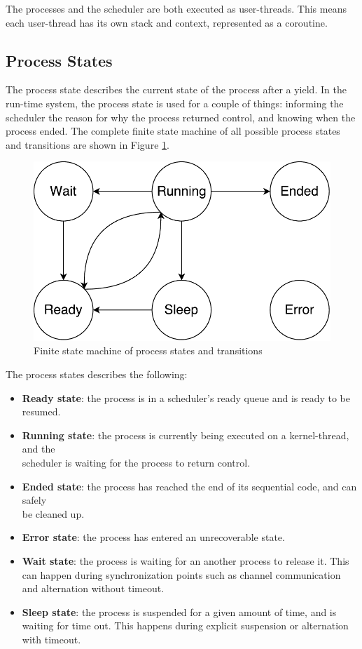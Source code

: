 The processes and the scheduler are both executed as user\hyp{}threads. This means each user\hyp{}thread has its own stack and context, represented as a coroutine.


\subsection{Process States}

The process state describes the current state of the process after a yield. In the run\hyp{}time system, the process state is used for a couple of things: informing the scheduler the reason for why the process returned control, and knowing when the process ended. The complete finite state machine of all possible process states and transitions are shown in Figure \ref{fig:process_state_fsm}. 
 
\FloatBarrier

\begin{figure}[h]
    \centering
    \includegraphics[width=0.6\linewidth]{fig/process_state_fsm}
    \caption{Finite state machine of process states and transitions}
    \label{fig:process_state_fsm}
\end{figure}

\FloatBarrier

The process states describes the following: 
\begin{itemize}[topsep=0em,itemsep=-1em,partopsep=-1em,parsep=1em]
    \item \textbf{Ready state}: the process is in a scheduler's ready queue and is ready to be resumed. 
    \item \textbf{Running state}: the process is currently being executed on a kernel\hyp{}thread, and the\\ scheduler is waiting for the process to return control.
    \item \textbf{Ended state}: the process has reached the end of its sequential code, and can safely\\ be cleaned up.
    \item \textbf{Error state}: the process has entered an unrecoverable state.
    \item \textbf{Wait state}: the process is waiting for an another process to release it. This can happen during synchronization points such as channel communication and alternation without timeout.
    \item \textbf{Sleep state}: the process is suspended for a given amount of time, and is waiting for time out. This happens during explicit suspension or alternation with timeout.  
\end{itemize}

